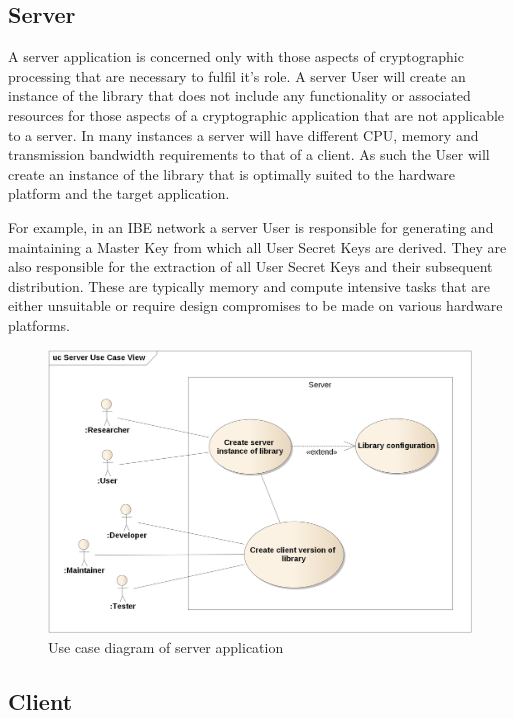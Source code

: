 \subsection{Server}

A server application is concerned only with those aspects of cryptographic processing that are necessary to fulfil it's role. A server User will create an instance of the library that does not include any functionality or associated resources for those aspects of a cryptographic application that are not applicable to a server. In many instances a server will have different CPU, memory and transmission bandwidth requirements to that of a client. As such the User will create an instance of the library that is optimally suited to the hardware platform and the target application.

For example, in an IBE network a server User is responsible for generating and maintaining a Master Key from which all User Secret Keys are derived. They are also responsible for the extraction of all User Secret Keys and their subsequent distribution. These are typically memory and compute intensive tasks that are either unsuitable or require design compromises to be made on various hardware platforms.

\begin{figure}[H]
\centering
\includegraphics[width=14cm]{server_use_case_view.png}
\caption{Use case diagram of server application}
\label{fig:use_case_2}
\end{figure}


\subsection{Client}

